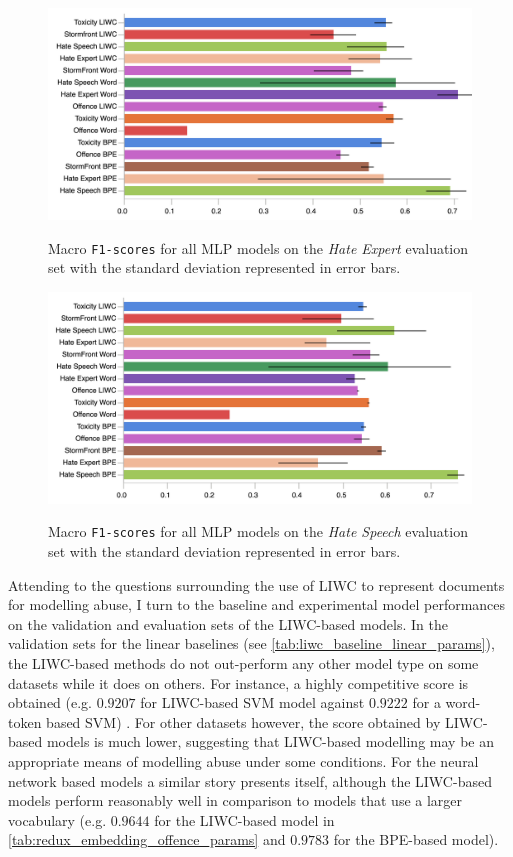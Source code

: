 \begin{figure}
\begin{minipage}{\textwidth}
\centering
    \includegraphics[width=\textwidth]{all_mlp_waseem_test.pdf}
    \caption{Macro \texttt{F1-scores} for all MLP models on the \textit{Hate Expert} evaluation set with the standard deviation represented in error bars.}
    \label{fig:waseem_mlp_test}
    \vfill
      \includegraphics[width=\textwidth]{all_mlp_waseem_hovy_test.pdf}
  \caption{Macro \texttt{F1-scores} for all MLP models on the \textit{Hate Speech} evaluation set with the standard deviation represented in error bars.}
  \label{fig:waseem_hovy_mlp_test}
\end{minipage}
\end{figure}

Attending to the questions surrounding the use of LIWC to represent documents for modelling abuse, I turn to the baseline and experimental model performances on the validation and evaluation sets of the LIWC-based models.
In the validation sets for the linear baselines (see \cref{tab:liwc_baseline_linear_params}), the LIWC-based methods do not out-perform any other model type on some datasets while it does on others. 
For instance, a highly competitive score is obtained (e.g. $0.9207$ for LIWC-based SVM model against $0.9222$ for a word-token based SVM) . 
For other datasets however, the score obtained by LIWC-based models is much lower, suggesting that LIWC-based modelling may be an appropriate means of modelling abuse under some conditions.
For the neural network based models a similar story presents itself, although the LIWC-based models perform reasonably well in comparison to models that use a larger vocabulary (e.g. $0.9644$ for the LIWC-based model in \cref{tab:redux_embedding_offence_params} and $0.9783$ for the BPE-based model).

